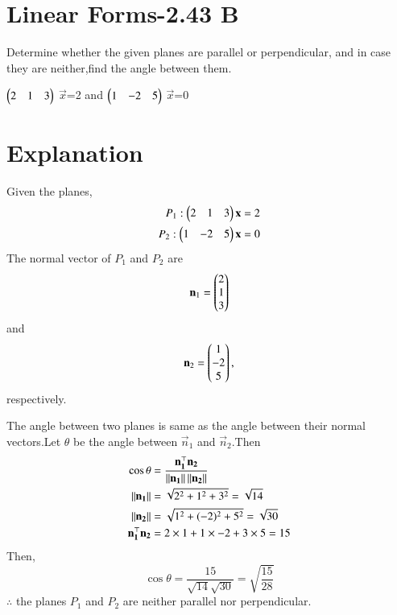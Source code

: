 \documentclass[journal,12pt,twocolumn]{IEEEtran}
\begin{document}
\section{Linear Forms-2.43 B}
Determine whether the given planes are parallel or perpendicular, and in case they are neither,find the angle between them.

$\begin{pmatrix}2&1&3\end{pmatrix}$ $\vec x$=2  and $\begin{pmatrix}1&-2&5\end{pmatrix}$ $\vec{x}$=0
\section{Explanation}
Given the planes,
\begin{align}
P_1:\begin{pmatrix}2&1&3\end{pmatrix}\mathbf{x}&=2 \\
P_2 :\begin{pmatrix}1&-2&5\end{pmatrix} \mathbf{x}&=0
\end{align}
The normal vector of $P_1$ and $P_2$ are 
\begin{equation}
 \mathbf n_1=\begin{pmatrix}2\\1\\3\end{pmatrix} \end{equation}and
 \begin{equation}
 \mathbf n_2 =\begin{pmatrix}1\\-2\\5\end{pmatrix},
\end{equation} respectively.

The angle between two planes is same as the angle between their normal vectors.Let $\theta$ be the angle between $\vec n_1$ and $\vec n_2$.Then
\begin{align}
    \cos\theta &= \frac{\mathbf{n_1^\top}\mathbf{n_2}}{\left\lVert\mathbf{n_1}\right\rVert\left\lVert\mathbf{n_2}\right\rVert}\\
    \left\lVert\mathbf{n_1}\right\rVert&=\sqrt{2^2+1^2+3^2}=\sqrt{14}\\
    \left\lVert\mathbf{n_2}\right\rVert&=\sqrt{1^2+(-2)^2+5^2}=\sqrt{30}\\
   \mathbf{n_1^\top}\mathbf{n_2}&=2\times1+1\times{-2}+3\times5=15
\end{align}
Then,\begin{equation}
\label{eq9}
    \cos{\theta}=\frac{15}{\sqrt{14}\sqrt{30}}=\sqrt{\frac{15}{28}}
\end{equation} 
$\therefore$ the planes $P_1$ and $P_2$ are neither parallel nor perpendicular.
\end{document}
